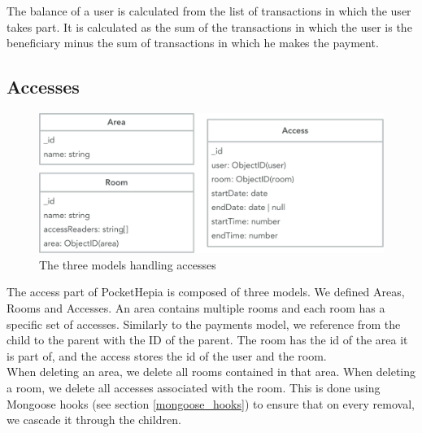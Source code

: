 \documentclass[twoside, openright,11pt,a4paper]{book}
\begin{document}
The balance of a user is calculated from the list of transactions in which the user takes part. It is calculated as the sum of the transactions in which the user is the beneficiary minus the sum of transactions in which he makes the payment.
\subsection{Accesses}
\begin{figure}[H]
\begin{center}
	\includegraphics[width=.8\textwidth]{assets/access_model}
	\caption{The three models handling accesses}
\end{center}
\end{figure}

The access part of PocketHepia is composed of three models. We defined Areas, Rooms and Accesses. An area contains multiple rooms and each room has a specific set of accesses. Similarly to the payments model, we reference from the child to the parent with the ID of the parent. The room has the id of the area it is part of, and the access stores the id of the user and the room. \\

When deleting an area, we delete all rooms contained in that area. When deleting a room, we delete all accesses associated with the room. This is done using Mongoose hooks (see section \ref{mongoose_hooks}) to ensure that on every removal, we cascade it through the children.
\end{document}
